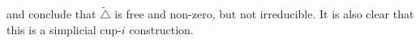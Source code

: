 \medskip\noindent and conclude that $\widetilde\triangle$ is free and non-zero, but not irreducible.
It is also clear that this is a simplicial cup-$i$ construction.



